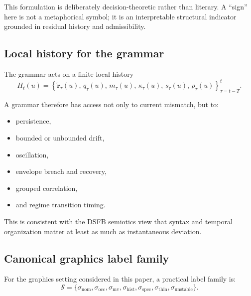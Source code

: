 \documentclass[11pt]{article}
\theoremstyle{definition}
\theoremstyle{plain}
\begin{document}
This formulation is deliberately decision-theoretic rather than literary. A “sign” here is not a metaphorical symbol; it is an interpretable structural indicator grounded in residual history and admissibility.


\subsection{Local history for the grammar}

The grammar acts on a finite local history
\begin{equation}
H_t(u)=
\left\{
\tilde{\mathbf r}_\tau(u),\,
q_\tau(u),\,
m_\tau(u),\,
\kappa_\tau(u),\,
s_\tau(u),\,
\rho_\tau(u)
\right\}_{\tau=t-T}^{t}.
\end{equation}

A grammar therefore has access not only to current mismatch, but to:
\begin{itemize}[leftmargin=1.5em]
    \item persistence,
    \item bounded or unbounded drift,
    \item oscillation,
    \item envelope breach and recovery,
    \item grouped correlation,
    \item and regime transition timing.
\end{itemize}

This is consistent with the DSFB semiotics view that syntax and temporal organization matter at least as much as instantaneous deviation. 


\subsection{Canonical graphics label family}

For the graphics setting considered in this paper, a practical label family is:
\begin{equation}
\mathcal S=
\{\sigma_{\mathrm{nom}},\sigma_{\mathrm{occ}},\sigma_{\mathrm{mv}},\sigma_{\mathrm{hist}},\sigma_{\mathrm{spec}},\sigma_{\mathrm{thin}},\sigma_{\mathrm{unstable}}\}.
\end{equation}
\end{document}
